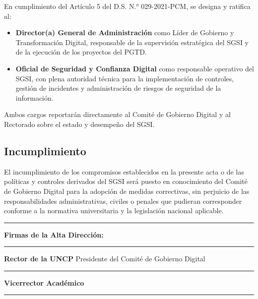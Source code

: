 \documentclass[10pt,letterpaper]{article}
\begin{document}
En cumplimiento del Artículo 5 del D.S. N.° 029-2021-PCM, se designa y
ratifica al:

\begin{itemize}
\tightlist
\item
  \textbf{Director(a) General de Administración} como Líder de Gobierno
  y Transformación Digital, responsable de la supervisión estratégica
  del SGSI y de la ejecución de los proyectos del PGTD.
\item
  \textbf{Oficial de Seguridad y Confianza Digital} como responsable
  operativo del SGSI, con plena autoridad técnica para la implementación
  de controles, gestión de incidentes y administración de riesgos de
  seguridad de la información.
\end{itemize}

Ambos cargos reportarán directamente al Comité de Gobierno Digital y al
Rectorado sobre el estado y desempeño del SGSI.

\subsection{Incumplimiento}\label{incumplimiento}

El incumplimiento de los compromisos establecidos en la presente acta o
de las políticas y controles derivados del SGSI será puesto en
conocimiento del Comité de Gobierno Digital para la adopción de medidas
correctivas, sin perjuicio de las responsabilidades administrativas,
civiles o penales que pudieran corresponder conforme a la normativa
universitaria y la legislación nacional aplicable.

\begin{center}\rule{0.5\linewidth}{0.5pt}\end{center}

\textbf{Firmas de la Alta Dirección:}

\begin{center}\rule{0.5\linewidth}{0.5pt}\end{center}

\textbf{Rector de la UNCP} Presidente del Comité de Gobierno Digital

\begin{center}\rule{0.5\linewidth}{0.5pt}\end{center}

\textbf{Vicerrector Académico}

\begin{center}\rule{0.5\linewidth}{0.5pt}\end{center}
\end{document}
